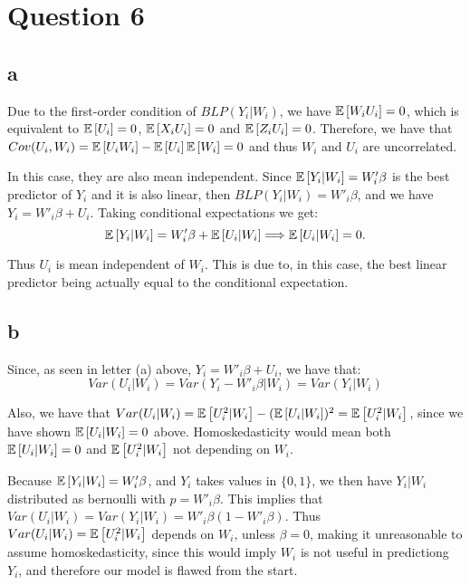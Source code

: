 \documentclass[12pt]{paper}
\begin{document}

\section*{Question 6}

\subsection*{a}

Due to the first-order condition of $BLP(Y_i|W_i)$, we have $\mathbb{E} \left [ W_iU_i \right ]=0$, which is equivalent to $\mathbb{E} \left [ U_i \right ]=0$, $\mathbb{E} \left [ X_iU_i \right ]=0$ and $\mathbb{E} \left [ Z_iU_i \right ]=0$. Therefore, we have that $Cov(U_i,W_i)=\mathbb{E} \left [ U_iW_i \right ]-\mathbb{E} \left [ U_i \right ]\mathbb{E} \left [ W_i \right ]=0$ and thus $W_i$ and $U_i$ are uncorrelated.

In this case, they are also mean independent. Since $\mathbb{E} \left [ Y_i|W_i \right ]=W'_i\beta$ is the best predictor of $Y_i$ and it is also linear, then $BLP(Y_i|W_i)=W'_i\beta$, and we have $Y_i=W'_i\beta+U_i$. Taking conditional expectations we get:
\begin{equation}
\mathbb{E} \left [ Y_i|W_i \right ]=W'_i\beta+\mathbb{E} \left [ U_i|W_i \right ] \Longrightarrow \mathbb{E} \left [ U_i|W_i \right ]=0.
\end{equation}

Thus $U_i$ is mean independent of $W_i$. This is due to, in this case, the best linear predictor being actually equal to the conditional expectation. 

\subsection*{b}

Since, as seen in letter (a) above, $Y_i=W'_i\beta+U_i$, we have that:
\begin{equation}
Var(U_i|W_i)=Var(Y_i-W'_i\beta|W_i)=Var(Y_i|W_i)
\end{equation}

Also, we have that $Var(U_i|W_i)=\mathbb{E} \left [ U_i^2|W_i \right ]-(\mathbb{E} \left [ U_i|W_i \right ])^2=\mathbb{E} \left [ U_i^2|W_i \right ]$, since we have shown $\mathbb{E} \left [ U_i|W_i \right ]=0$ above. Homoskedasticity would mean both $\mathbb{E} \left [ U_i|W_i \right ]=0$ and $\mathbb{E} \left [ U_i^2|W_i \right ]$ not depending on $W_i$.

Because $\mathbb{E} \left [ Y_i|W_i \right ]=W'_i\beta$, and $Y_i$ takes values in $\{0,1\}$, we then have $Y_i|W_i$ distributed as bernoulli with $p=W'_i\beta$. This implies that $Var(U_i|W_i)=Var(Y_i|W_i)=W'_i\beta(1-W'_i\beta)$. Thus $Var(U_i|W_i)=\mathbb{E} \left [ U_i^2|W_i \right ]$ depends on $W_i$, unless $\beta=0$, making it unreasonable to assume homoskedasticity, since this would imply $W_i$ is not useful in predictiong $Y_i$, and therefore our model is flawed from the start.
\end{document}
